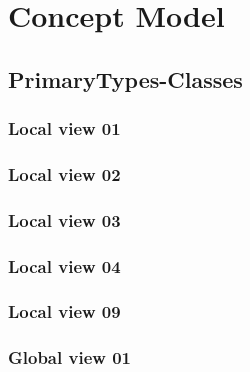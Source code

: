 
\chapter{Concept Model}
\label{chap:lu.uni.lassy.excalibur.examples.icrash-CM}


\section{PrimaryTypes-Classes}
\subsection{Local view 01}
\label{sec:lu.uni.lassy.excalibur.examples.icrash-CM-view-local-PrimaryTypes-Classes-01}

\subsection{Local view 02}
\label{sec:lu.uni.lassy.excalibur.examples.icrash-CM-view-local-PrimaryTypes-Classes-02}

\subsection{Local view 03}
\label{sec:lu.uni.lassy.excalibur.examples.icrash-CM-view-local-PrimaryTypes-Classes-03}

\subsection{Local view 04}
\label{sec:lu.uni.lassy.excalibur.examples.icrash-CM-view-local-PrimaryTypes-Classes-04}

\subsection{Local view 09}
\label{sec:lu.uni.lassy.excalibur.examples.icrash-CM-view-local-PrimaryTypes-Classes-09}


\subsection{Global view 01}
\label{sec:lu.uni.lassy.excalibur.examples.icrash-CM-view-global-PrimaryTypes-Classes-01}



